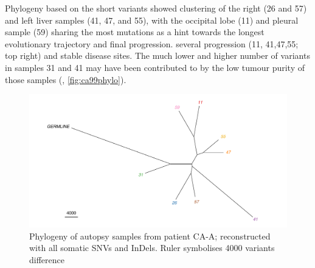 Phylogeny based on the short variants showed  clustering of the right (26 and 57) and left liver samples (41, 47, and 55), with the occipital lobe (11) and pleural sample (59) sharing the most mutations as a hint towards the longest evolutionary trajectory and final progression.  several progression (11, 41,47,55; top right) and stable disease sites. The much lower and higher number of variants in  samples 31 and 41 may have been contributed to by the low tumour purity of those samples (, \autoref{fig:ca99phylo}).

\begin{figure}[htp]
	\centering
	\includegraphics[width=.99\linewidth]{Figures/CASCADE/CA99/CA99phylo.pdf}
	\caption[Phylogeny of autopsy samples from patient CA-A]{Phylogeny of autopsy samples from patient CA-A; reconstructed with all somatic SNVs and InDels. Ruler symbolises 4000 variants difference} \label{fig:ca99phylo}
\end{figure}

